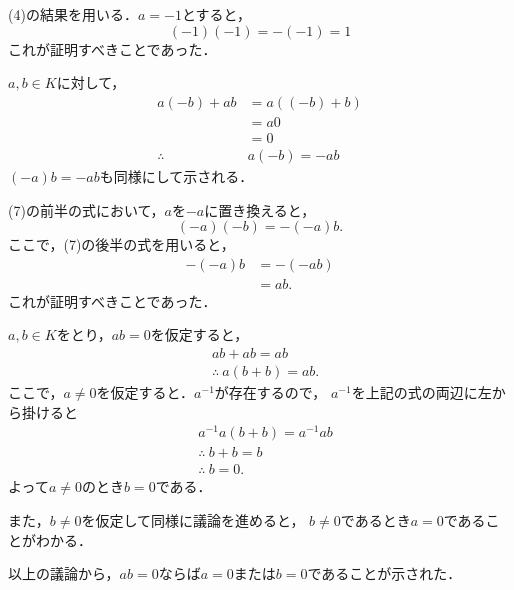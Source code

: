 \begin{tproof}
    (4)の結果を用いる．$a=-1$とすると，
    \[
        (-1)(-1)=-(-1)=1
    \]
    これが証明すべきことであった．
\end{tproof}
\begin{tproof}
    $a,b \in K$に対して，
    \begin{align*}
        a(-b)+ab         & = a((-b)+b) \\
                         & = a0        \\
                         & =0          \\
        \therefore \quad & a(-b)=-ab
    \end{align*}
    $(-a)b = -ab$も同様にして示される．
\end{tproof}

\begin{tproof}
    (7)の前半の式において，$a$を$-a$に置き換えると，
    \[
        (-a)(-b) = -(-a)b.
    \]
    ここで，(7)の後半の式を用いると，
    \begin{align*}
        -(-a)b & = -(-ab) \\
               & = ab.
    \end{align*}
    これが証明すべきことであった．
\end{tproof}


\begin{tproof}
    $ a, b \in K$をとり，$ab =0$を仮定すると，
    \begin{align*}
         & ab + ab = ab            \\
         & \therefore ~ a(b+b)=ab.
    \end{align*}
    ここで，$a \ne 0$を仮定すると．$a^{-1}$が存在するので，
    $a^{-1}$を上記の式の両辺に左から掛けると
    \begin{align*}
         & a^{-1}a(b+b)=a^{-1}ab \\
         & \therefore ~ b+b=b    \\
         & \therefore ~ b=0.
    \end{align*}
    よって$a \ne 0$のとき$b=0$である．

    また，$b \ne 0$を仮定して同様に議論を進めると，
    $b \ne 0$であるとき$ a=0$であることがわかる．

    以上の議論から，$ab=0$ならば$a=0$または$b=0$であることが示された．
\end{tproof}

